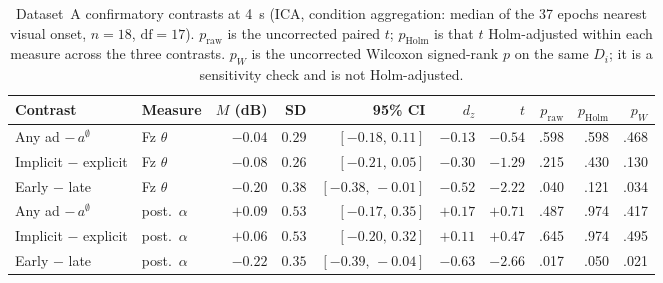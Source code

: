 \documentclass[english]{article}
\begin{document}
\begin{table}[H]
\centering
\small
\caption{Dataset~A confirmatory contrasts at 4~s (ICA, condition aggregation: median of the 37 epochs nearest visual onset, \(n=18\), \(\mathrm{df}=17\)).
\(p_{\mathrm{raw}}\) is the uncorrected paired \(t\); \(p_{\mathrm{Holm}}\) is that \(t\) Holm-adjusted within each measure across the three contrasts.
\(p_{W}\) is the uncorrected Wilcoxon signed-rank \(p\) on the same \(D_{i}\); it is a sensitivity check and is not Holm-adjusted.}
\label{tab:eeg-dataset-a}
\setlength{\tabcolsep}{4pt}
\begin{tabular}{@{}ll rrr rr rrr@{}}
\toprule
Contrast & Measure & \(M\) (dB) & SD & 95\% CI & \(d_z\) & \(t\) & \(p_{\mathrm{raw}}\) & \(p_{\mathrm{Holm}}\) & \(p_{W}\) \\
\midrule
Any ad \(-\,a^{\emptyset}\) & Fz \(\theta\) & $-0.04$ & $0.29$ & $[-0.18,\,0.11]$ & $-0.13$ & $-0.54$ & .598 & .598 & .468 \\
Implicit \(-\) explicit & Fz \(\theta\) & $-0.08$ & $0.26$ & $[-0.21,\,0.05]$ & $-0.30$ & $-1.29$ & .215 & .430 & .130 \\
Early \(-\) late & Fz \(\theta\) & $-0.20$ & $0.38$ & $[-0.38,\,-0.01]$ & $-0.52$ & $-2.22$ & .040 & .121 & .034 \\
Any ad \(-\,a^{\emptyset}\) & post.\ \(\alpha\) & $+0.09$ & $0.53$ & $[-0.17,\,0.35]$ & $+0.17$ & $+0.71$ & .487 & .974 & .417 \\
Implicit \(-\) explicit & post.\ \(\alpha\) & $+0.06$ & $0.53$ & $[-0.20,\,0.32]$ & $+0.11$ & $+0.47$ & .645 & .974 & .495 \\
Early \(-\) late & post.\ \(\alpha\) & $-0.22$ & $0.35$ & $[-0.39,\,-0.04]$ & $-0.63$ & $-2.66$ & .017 & .050 & .021 \\
\bottomrule
\end{tabular}
\end{table}
\end{document}
